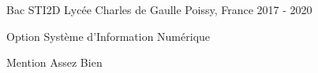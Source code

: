\begin{cventries}
  \cventry
    {Bac STI2D} %
    {Lycée Charles de Gaulle} %
    {Poissy, France} %
    {2017 - 2020} %
    {
      \begin{cvitems} %
        \item {Option Système d'Information Numérique}
        \item {Mention Assez Bien}
      \end{cvitems}
    }
\end{cventries}
